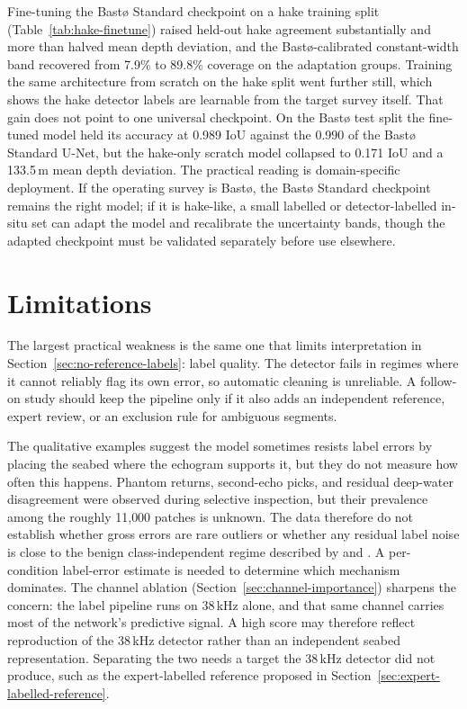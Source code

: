 Fine-tuning the Bast\o{} Standard checkpoint on a hake training split (Table~\ref{tab:hake-finetune}) raised held-out hake agreement substantially and more than halved mean depth deviation, and the Bast\o{}-calibrated constant-width band recovered from 7.9\% to 89.8\% coverage on the adaptation groups. Training the same architecture from scratch on the hake split went further still, which shows the hake detector labels are learnable from the target survey itself. That gain does not point to one universal checkpoint. On the Bast\o{} test split the fine-tuned model held its accuracy at 0.989 IoU against the 0.990 of the Bast\o{} Standard U-Net, but the hake-only scratch model collapsed to 0.171 IoU and a 133.5\,m mean depth deviation. The practical reading is domain-specific deployment. If the operating survey is Bast\o{}, the Bast\o{} Standard checkpoint remains the right model; if it is hake-like, a small labelled or detector-labelled in-situ set can adapt the model and recalibrate the uncertainty bands, though the adapted checkpoint must be validated separately before use elsewhere.

\section{Limitations}
\label{sec:weaknesses}

The largest practical weakness is the same one that limits interpretation in Section~\ref{sec:no-reference-labels}: label quality. The detector fails in regimes where it cannot reliably flag its own error, so automatic cleaning is unreliable. A follow-on study should keep the pipeline only if it also adds an independent reference, expert review, or an exclusion rule for ambiguous segments.

The qualitative examples suggest the model sometimes resists label errors by placing the seabed where the echogram supports it, but they do not measure how often this happens. Phantom returns, second-echo picks, and residual deep-water disagreement were observed during selective inspection, but their prevalence among the roughly 11{,}000 patches is unknown. The data therefore do not establish whether gross errors are rare outliers or whether any residual label noise is close to the benign class-independent regime described by \citet{manwani_noise_2013} and \citet{karimi_deep_2020}. A per-condition label-error estimate is needed to determine which mechanism dominates. The channel ablation (Section~\ref{sec:channel-importance}) sharpens the concern: the label pipeline runs on 38\,kHz alone, and that same channel carries most of the network's predictive signal. A high score may therefore reflect reproduction of the 38\,kHz detector rather than an independent seabed representation. Separating the two needs a target the 38\,kHz detector did not produce, such as the expert-labelled reference proposed in Section~\ref{sec:expert-labelled-reference}.


